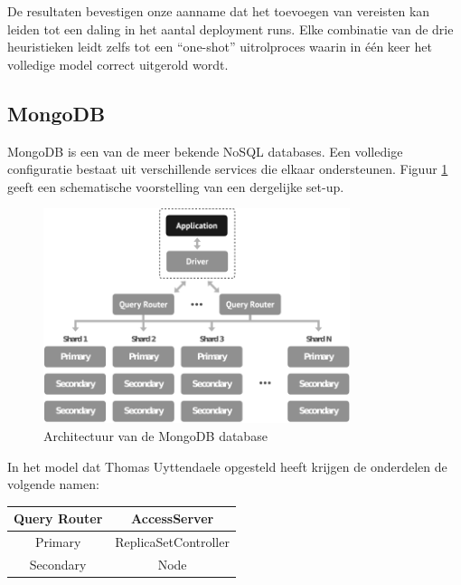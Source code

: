 De resultaten bevestigen onze aanname dat het toevoegen van vereisten kan leiden tot een daling in het aantal deployment runs.
Elke combinatie van de drie heuristieken leidt zelfs tot een ``one-shot'' uitrolproces waarin in \'e\'en keer het volledige model correct uitgerold wordt.

\subsection{MongoDB}

MongoDB is een van de meer bekende NoSQL databases.
Een volledige configuratie bestaat uit verschillende services die elkaar ondersteunen.
Figuur \ref{fig:mongodb_architecture} geeft een schematische voorstelling van een dergelijke set-up. 

\begin{figure}[h]
    \begin{center}
    \includegraphics[width=0.8\textwidth]{images/mongodb_architecture.pdf}
    \caption{Architectuur van de MongoDB database}
    \label{fig:mongodb_architecture}
    \end{center}
\end{figure}

In het model dat Thomas Uyttendaele opgesteld heeft  krijgen de onderdelen de volgende namen:

\begin{table}[h!]
  \begin{center}
  \begin{tabular}{c | c}
  Query Router  & AccessServer \\ \hline
  Primary       & ReplicaSetController \\ \hline
  Secondary     & Node \\ 
  \end{tabular}
  \end{center}
\end{table}

